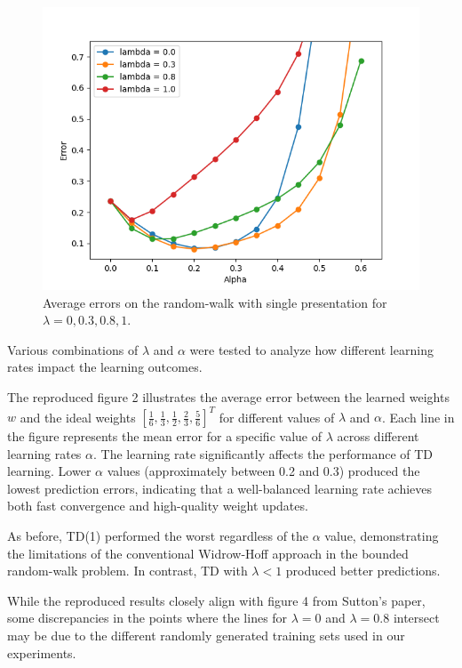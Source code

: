 \documentclass[lettersize,journal]{IEEEtran}
\begin{document}
\begin{figure}[ht]
    \centering
    \includegraphics[width=0.8\linewidth]{figure4.png} 
    \caption{Average errors on the random-walk with single presentation for $\lambda = 0, 0.3, 0.8, 1$.}
    \label{fig:avg_errors_single_presentation}
\end{figure}


Various combinations of $\lambda$ and $\alpha$ were tested to analyze how different learning rates impact the learning outcomes.

The reproduced figure 2 illustrates the average error between the learned weights $w$ and the ideal weights $[\frac{1}{6}, \frac{1}{3}, \frac{1}{2}, \frac{2}{3}, \frac{5}{6}]^T$ for different values of $\lambda$ and $\alpha$. Each line in the figure represents the mean error for a specific value of $\lambda$ across different learning rates $\alpha$. The learning rate significantly affects the performance of TD learning. Lower $\alpha$ values (approximately between 0.2 and 0.3) produced the lowest prediction errors, indicating that a well-balanced learning rate achieves both fast convergence and high-quality weight updates.

As before, TD(1) performed the worst regardless of the $\alpha$ value, demonstrating the limitations of the conventional Widrow-Hoff approach in the bounded random-walk problem. In contrast, TD with $\lambda < 1$ produced better predictions.

While the reproduced results closely align with figure 4 from Sutton's paper, some discrepancies in the points where the lines for $\lambda = 0$ and $\lambda = 0.8$ intersect may be due to the different randomly generated training sets used in our experiments.
\end{document}
